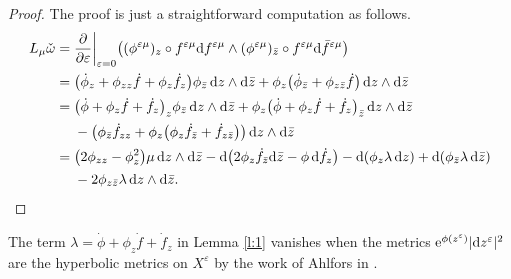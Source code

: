 \documentclass[pdftex]{sigma}%
\numberwithin{equation}{section}
\newcommand{\pa}{\partial}
\newcommand{\vep}{\varepsilon}
\begin{document}
\begin{proof}
The proof is just a straightforward computation as follows.
\begin{align*}
L_{\mu}\check{\omega}={}& \frac{\pa}{\pa\vep}\bigg|_{\vep=0} \big((\phi^{\vep\mu})_z\circ f^{\vep\mu} {\rm d}f^{\vep\mu} \wedge(\phi^{\vep\mu})_{\bar{z}}\circ f^{\vep\mu} {\rm d}\bar{f}^{\vep\mu} \big)
\\[.3ex]
={}&\big(\dot{\phi}_z +\phi_{zz} \dot{f} +\phi_z \dot{f}_{{z}}\big)\phi_{\bar{z}}\, {\rm d}z\wedge {\rm d}\bar{z}+ \phi_z\big(\dot{\phi}_{\bar{z}}+\phi_{z\bar{z}}\dot{f}\big)\, {\rm d}z\wedge {\rm d}\bar{z}
\\[.3ex]
={}&\big(\dot{\phi} +\phi_{z} \dot{f} + \dot{f}_{{z}}\big)_z\phi_{\bar{z}}\, {\rm d}z\wedge {\rm d}\bar{z}+ \phi_z\big(\dot{\phi}+\phi_{z}\dot{f}+\dot{f}_z\big)_{\bar{z}} \, {\rm d}z\wedge {\rm d}\bar{z}
\\[.3ex]
 &-\big(\phi_{\bar{z}} \dot{f}_{zz} +\phi_z\big(\phi_z\dot{f}_{\bar{z}}+\dot{f}_{z\bar{z}}\big)\big)\, {\rm d}z\wedge {\rm d}\bar{z}
 \\[.3ex]
 ={}&\big(2\phi_{zz}-\phi^2_z\big)\mu\, {\rm d}z\wedge {\rm d}\bar{z}-{\rm d}\big(2\phi_z\dot{f}_{\bar{z}}{\rm d}\bar{z}-\phi \,{\rm d}\dot{f}_z\big) -{\rm d}(\phi_z \lambda \,{\rm d}z) +{\rm d}(\phi_{\bar{z}} \lambda \,{\rm d}\bar{z})
 \\[.3ex]
 &-2\phi_{z\bar{z}} \lambda\, {\rm d}z\wedge {\rm d}\bar{z}.\tag*{\qed}
\end{align*}
\renewcommand{\qed}{}
\end{proof}


\begin{Remark}
The term $\lambda=\dot{\phi}+\phi_z \dot{f} +\dot{f}_z$ in Lemma \ref{l:1} vanishes when the metrics ${\rm e}^{\phi(z^\vep)} |{\rm d}z^\vep|^2$ are the hyperbolic metrics on $X^\vep$ by the work of Ahlfors in \cite{3}.
\end{Remark}
\end{document}
